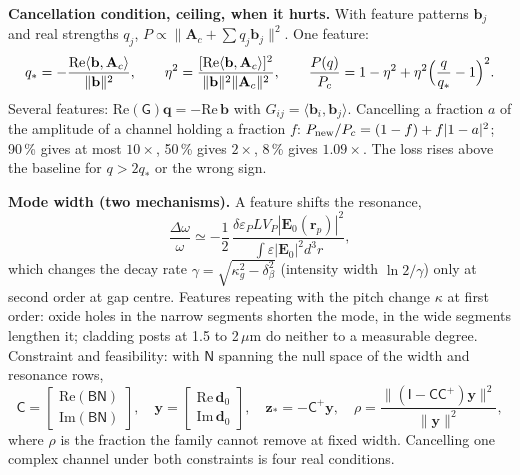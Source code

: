 \documentclass[11pt,a4paper]{article}
\begin{document}
\textbf{Cancellation condition, ceiling, when it hurts.} With feature patterns $\mathbf b_j$ and real strengths
$q_j$, $P\propto\|\mathbf A_c+\sum q_j\mathbf b_j\|^2$. One feature:
\[
q_*=-\frac{\mathrm{Re}\langle\mathbf b,\mathbf A_c\rangle}{\|\mathbf b\|^2},\qquad
\eta^2=\frac{[\mathrm{Re}\langle\mathbf b,\mathbf A_c\rangle]^2}{\|\mathbf b\|^2\|\mathbf A_c\|^2},\qquad
\frac{P(q)}{P_c}=1-\eta^2+\eta^2\Bigl(\frac q{q_*}-1\Bigr)^2 .
\]
Several features: $\mathrm{Re}(\mathsf G)\mathbf q=-\mathrm{Re}\,\mathbf b$ with
$G_{ij}=\langle\mathbf b_i,\mathbf b_j\rangle$. Cancelling a fraction $a$ of the amplitude of a channel holding
a fraction $f$: $P_{\rm new}/P_c=(1-f)+f|1-a|^2$; 90\,\% gives at most $10\times$, 50\,\% gives $2\times$, 8\,\%
gives $1.09\times$. The loss rises above the baseline for $q>2q_*$ or the wrong sign.

\textbf{Mode width (two mechanisms).} A feature shifts the resonance,
\[
\frac{\Delta\omega}{\omega}\simeq-\frac12\,\frac{\delta\varepsilon_PLV_P|\mathbf E_0(\mathbf r_p)|^2}{\int\varepsilon|\mathbf E_0|^2d^3r},
\]
which changes the decay rate $\gamma=\sqrt{\kappa_g^2-\delta_\beta^2}$ (intensity width $\ln2/\gamma$) only at
second order at gap centre. Features repeating with the pitch change $\kappa$ at first order: oxide holes in the
narrow segments shorten the mode, in the wide segments lengthen it; cladding posts at 1.5 to 2\,$\mu$m do neither
to a measurable degree. Constraint and feasibility: with $\mathsf N$ spanning the null space of the width and
resonance rows,
\[
\mathsf C=\begin{bmatrix}\mathrm{Re}(\mathsf{BN})\\\mathrm{Im}(\mathsf{BN})\end{bmatrix},\quad
\mathbf y=\begin{bmatrix}\mathrm{Re}\,\mathbf d_0\\\mathrm{Im}\,\mathbf d_0\end{bmatrix},\quad
\mathbf z_*=-\mathsf C^+\mathbf y,\quad
\rho=\frac{\|(\mathsf I-\mathsf{CC}^+)\mathbf y\|^2}{\|\mathbf y\|^2},
\]
where $\rho$ is the fraction the family cannot remove at fixed width. Cancelling one complex channel under both constraints is four real
conditions.
\end{document}
